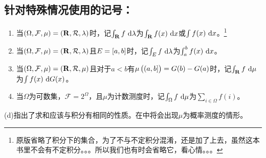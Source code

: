 \documentclass[../main.tex]{subfiles}
\begin{document}
\subsection*{针对特殊情况使用的记号：}
\begin{enumerate}[label=(\alph*)]
	\item 当\((\Omega,\mathcal{F},\mu)=(\mathbf{R},\mathcal{R},\lambda)\)时，记\(\int_\R f\,\dif\lambda\)为\(\int_\R f(x)\,\dif x\)或\(\int f(x)\,\dif x\)。\footnote{原版省略了积分下的集合，为了不与不定积分混淆，还是加了上去，虽然这本书里不会有不定积分。。。所以我们也有时会省略它，看心情。。。}
	\item 当\((\Omega,\mathcal{F},\mu)=(\mathbf{R},\mathcal{R},\lambda)\)且\(E=\intcc{a,b}\)时，记\(\int_E f\,\dif\lambda\)为\(\int_a^b f(x)\,\dif x\)。
	\item 当\((\Omega,\mathcal{F},\mu)=(\mathbf{R},\mathcal{R},\mu)\)且对于\(a<b\)有\(\mu\del{\intoc{a,b}}=G(b)-G(a)\)时，记\(\int_\R f\,\dif\mu\)为\(\int f(x)\,\dif G(x)\)。
	\item 当\(\Omega\)为可数集，\(\mathcal{F}=2^\Omega\)，且\(\mu\)为计数测度时，记\(\int_\Omega f\,\dif\mu\)为\(\sum_{i\in\Omega}f(i)\)。
\end{enumerate}
(d)指出了求和应该与积分有相同的性质。在中将会出现\(\mu\)为概率测度的情形。
\end{document}
